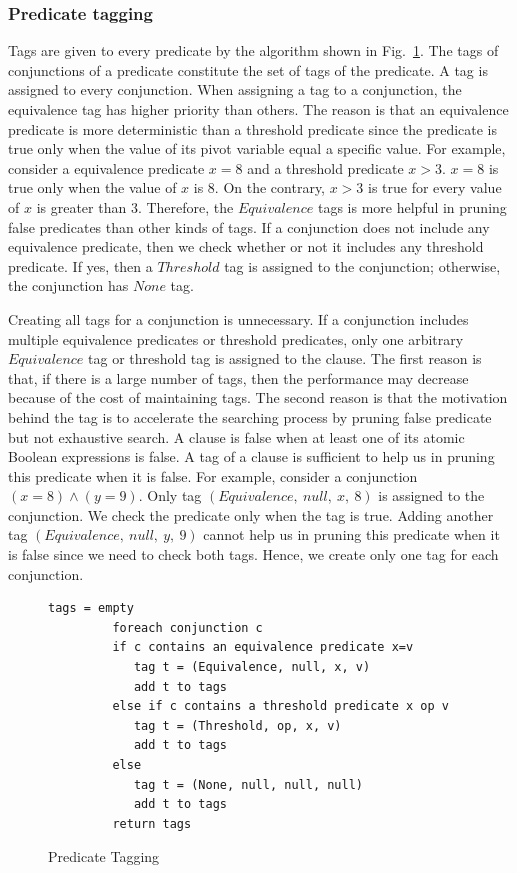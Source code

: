 \documentclass[preprint]{sigplanconf}
\begin{document}
\subsubsection{Predicate tagging}
Tags are given to every predicate by the algorithm shown in
Fig.~\ref{fig:tagging}. The tags of conjunctions of a predicate constitute the 
set of tags of the predicate. A tag is assigned to every conjunction. When assigning a 
tag to a conjunction, the equivalence tag has higher priority than others. The
reason is that an equivalence predicate is more deterministic than a threshold 
predicate since the predicate is true only when the value of its pivot variable 
equal a specific value. For example, consider a equivalence predicate $x = 8$
and a threshold predicate $x > 3$. $x = 8$ is true only when the value of $x$
is $8$. On the contrary, $x > 3$ is true for every value of $x$ is greater than
$3$. Therefore, the $Equivalence$ tags is more helpful in
pruning false predicates than other kinds of tags. If a conjunction does not 
include any equivalence predicate, then we check whether or not it 
includes any threshold predicate. If yes, then a $Threshold$ tag is assigned 
to the conjunction; otherwise, the conjunction has $None$ tag. 

Creating all tags for a conjunction is unnecessary. If a conjunction includes 
multiple equivalence predicates or threshold predicates, only one arbitrary 
$Equivalence$ tag or threshold tag is assigned to the clause. The first reason is 
that, if there is a large number of tags, then the performance may decrease
because of the cost of maintaining tags. The second reason is that the motivation behind 
the tag is to accelerate the searching process by pruning false predicate 
but not exhaustive search.  A clause is false when at least one 
of its atomic Boolean expressions is false. A tag of a clause is sufficient to 
help us in pruning this predicate when it is false. For example, consider a
conjunction $(x = 8) \wedge (y = 9)$. Only tag $(Equivalence,\ null,\ x,\ 8)$
is assigned to the conjunction. We check the predicate only when the tag is
true. Adding another tag $(Equivalence,\ null,\ y,\ 9)$ cannot help us in pruning
this predicate when it is false since we need to check both tags. Hence, we 
create only one tag for each conjunction.
 
\begin{figure}[ht!]
    \begin{Verbatim}[fontsize=\footnotesize,gobble=8,frame=lines,
            framesep=3mm]
         tags = empty
         foreach conjunction c 
         if c contains an equivalence predicate x=v
            tag t = (Equivalence, null, x, v)
            add t to tags
         else if c contains a threshold predicate x op v
            tag t = (Threshold, op, x, v)
            add t to tags
         else 
            tag t = (None, null, null, null)
            add t to tags
         return tags
    \end{Verbatim}
  \caption{Predicate Tagging}
  \label{fig:tagging}
\end{figure}
\end{document}
